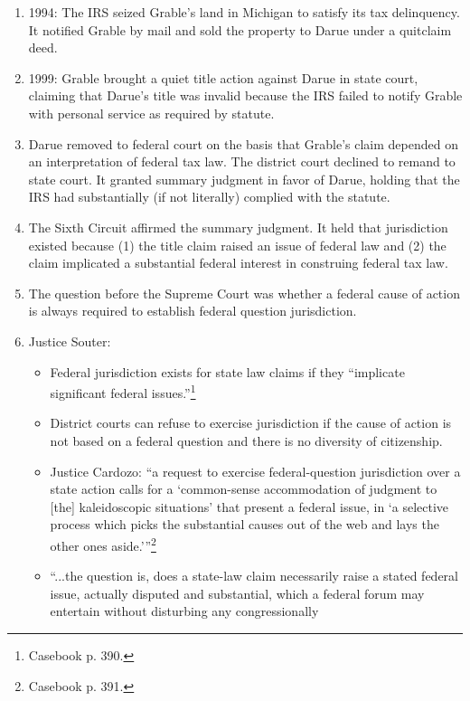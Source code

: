 \begin{enumerate}
    \item 1994: The IRS seized Grable's land in Michigan to satisfy its tax 
    delinquency. It notified Grable by mail and sold the property to Darue 
    under a quitclaim deed.
    \item 1999: Grable brought a quiet title action against Darue in state 
    court, claiming that Darue's title was invalid because the IRS failed to 
    notify Grable with personal service as required by statute.
    \item Darue removed to federal court on the basis that Grable's claim 
    depended on an interpretation of federal tax law. The district court 
    declined to remand to state court. It granted summary judgment in favor of 
    Darue, holding that the IRS had substantially (if not literally) complied 
    with the statute.
    \item The Sixth Circuit affirmed the summary judgment. It held that 
    jurisdiction existed because (1) the title claim raised an issue of 
    federal law and (2) the claim implicated a substantial federal interest in 
    construing federal tax law.
    \item The question before the Supreme Court was whether a federal cause of 
    action is always required to establish federal question jurisdiction.
    \item Justice Souter:
    \begin{itemize}
        \item Federal jurisdiction exists for state law claims if they 
        ``implicate significant federal issues.''\footnote{Casebook p. 390.}
        \item District courts can refuse to exercise jurisdiction if the cause 
        of action is not based on a federal question and there is no diversity 
        of citizenship.
        \item Justice Cardozo: \enquote{a request to exercise federal-question 
        jurisdiction over a state action calls for a \enquote{common-sense 
        accommodation of judgment to [the] kaleidoscopic situations} that 
        present a federal issue, in \enquote{a selective process which picks 
        the substantial causes out of the web and lays the other ones 
        aside.}}\footnote{Casebook p. 391.}
        \item ``...the question is, does a state-law claim necessarily raise a 
        stated federal issue, actually disputed and substantial, which a 
        federal forum may entertain without disturbing any congressionally 

\end{itemize}
\end{enumerate}
